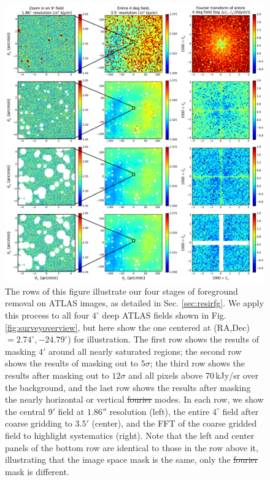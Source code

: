 \documentclass[numberedappendix]{emulateapj}
\providecommand{\DIFadd}[1]{{\protect\color{blue}\uwave{#1}}} %
\providecommand{\DIFdel}[1]{{\protect\color{red}\sout{#1}}}                      %
\providecommand{\DIFaddFL}[1]{\DIFadd{#1}} %
\providecommand{\DIFdelFL}[1]{\DIFdel{#1}} %
\providecommand{\DIFaddbeginFL}{} %
\providecommand{\DIFaddendFL}{} %
\providecommand{\DIFdelbeginFL}{} %
\providecommand{\DIFdelendFL}{} %
\begin{document}
\begin{figure}[h]
\centering
\includegraphics[width=7in]{big_foreground_masking_study_2_magoffset=20_56+0_274.pdf}
\caption[Images of our 850\,nm field after various stages of foreground masking.]{The rows of this figure illustrate our four stages of foreground removal on ATLAS images, as detailed in Sec. \ref{sec:resirfg}. We apply this process to all four $4^\circ$ deep ATLAS fields shown in Fig. \ref{fig:surveyoverview}, but here show the one centered at (RA,Dec)$=2.74^\circ, -24.79^\circ$) for illustration. The first row shows the results of masking $4'$ around all nearly saturated regions; the second row shows the results of masking out to $5\sigma$; the third row shows the results after masking out to $12\sigma$ and all pixels above 70\,kJy/sr over the background, and the last row shows the results after masking the nearly horizontal or vertical \DIFdelbeginFL \DIFdelFL{fourier }\DIFdelendFL \DIFaddbeginFL \DIFaddFL{Fourier }\DIFaddendFL modes. In each row, we show the central $9'$ field at $1.86''$ resolution (left), the entire $4^\circ$ field after coarse gridding to $3.5'$ (center), and the FFT of the coarse gridded field to highlight systematics (right). Note that the left and center panels of the bottom row are identical to those in the row above it, illustrating that the image space mask is the same, only the \DIFdelbeginFL \DIFdelFL{fourier }\DIFdelendFL \DIFaddbeginFL \DIFaddFL{Fourier }\DIFaddendFL mask is different.}
\label{fig:bigfgmaskingstudy}
\end{figure}
\end{document}
